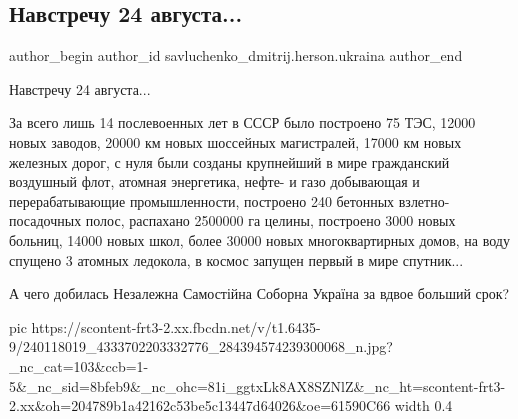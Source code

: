 
 
 
 
 
 
\subsection{Навстречу 24 августа...}
\label{sec:21_08_2021.fb.savluchenko_dmitrij.herson.ukraina.1.nezalezhnist}
 
\ifcmt
 author_begin
   author_id savluchenko_dmitrij.herson.ukraina
 author_end
\fi

Навстречу 24 августа...

За всего лишь 14 послевоенных лет в СССР было построено 75 ТЭС, 12000 новых
заводов, 20000 км новых шоссейных магистралей, 17000 км новых железных дорог, с
нуля были созданы крупнейший в мире гражданский воздушный флот, атомная
энергетика, нефте- и газо добывающая и перерабатывающие промышленности,
построено 240 бетонных взлетно-посадочных полос, распахано 2500000 га целины,
построено 3000 новых больниц, 14000 новых школ, более 30000 новых
многоквартирных домов, на воду спущено 3 атомных ледокола, в космос запущен
первый в мире спутник...

А чего добилась Незалежна Самостійна Соборна Україна за вдвое больший срок?

\ifcmt
  pic https://scontent-frt3-2.xx.fbcdn.net/v/t1.6435-9/240118019_4333702203332776_284394574239300068_n.jpg?_nc_cat=103&ccb=1-5&_nc_sid=8bfeb9&_nc_ohc=81i_ggtxLk8AX8SZNlZ&_nc_ht=scontent-frt3-2.xx&oh=204789b1a42162c53be5c13447d64026&oe=61590C66
  width 0.4
\fi
